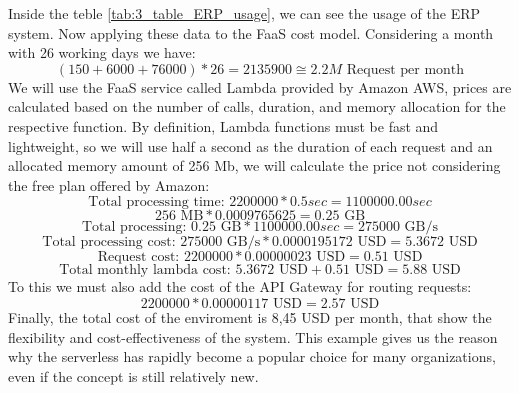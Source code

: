 Inside the teble \ref{tab:3_table_ERP_usage}, we can see the usage of the ERP system. Now applying
these data to the FaaS cost model.
Considering a month with 26 working days we have:
\begin{equation}
    (150 + 6000 + 76000) * 26 = 2135900 \cong 2.2M \text{ Request per month}
\end{equation}
We will use the FaaS service called Lambda provided by Amazon AWS, prices are calculated based on
the number of calls, duration, and memory allocation for the respective function. By definition,
Lambda functions must be fast and lightweight, so we will use half a second as the duration of each
request and an allocated memory amount of 256 Mb, we will calculate the price not considering the
free plan offered by Amazon:
\begin{equation}
    \text{Total processing time: } 2200000 * 0.5 sec = 1100000.00 sec
\end{equation}
\begin{equation}
    256 \text{ MB} * 0.0009765625 = 0.25 \text{ GB}
\end{equation}
\begin{equation}
    \text{Total processing: } 0.25 \text{ GB} * 1100000.00 sec = 275000 \text{ GB/s}
\end{equation}
\begin{equation}
    \text{Total processing cost: } 275000 \text{ GB/s} * 0.0000195172 \text{ USD} = 5.3672 \text{ USD}
\end{equation}
\begin{equation}
    \text{Request cost: } 2200000 * 0.00000023 \text{ USD} = 0.51 \text{ USD}
\end{equation}
\begin{equation}
    \text{Total monthly lambda cost: }5.3672 \text{ USD} + 0.51 \text{ USD} = 5.88 \text{ USD}
\end{equation}
To this we must also add the cost of the API Gateway for routing requests:
\begin{equation}
    2200000 * 0.00000117 \text{ USD} = 2.57 \text{ USD}
\end{equation}
Finally, the total cost of the enviroment is 8,45 USD per month, that show the flexibility and
cost-effectiveness of the system. This example gives us the reason why the serverless has rapidly
become a popular choice for many organizations, even if the concept is still relatively new.
